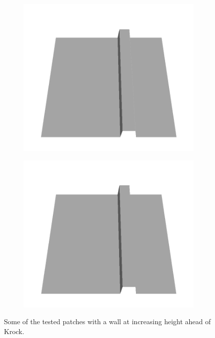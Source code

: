 \documentclass[../document.tex]{subfiles}
\begin{document}
\begin{figure} [htbp]
\begin{subfigure}[b]{0.24\textwidth}
    \end{subfigure}
    \begin{subfigure}[b]{0.24\textwidth}
    \includegraphics[width=\linewidth]{../img/5/custom_patches/walls_increasing/all/17-3d.png}
    \end{subfigure}
    \begin{subfigure}[b]{0.24\textwidth}
    \includegraphics[width=\linewidth]{../img/5/custom_patches/walls_increasing/all/19-3d.png}
    \end{subfigure}
    \caption{Some of the tested patches with a wall at increasing height ahead of Krock.}
\label{fig :walls-height}
    \end{figure}
\end{document}
